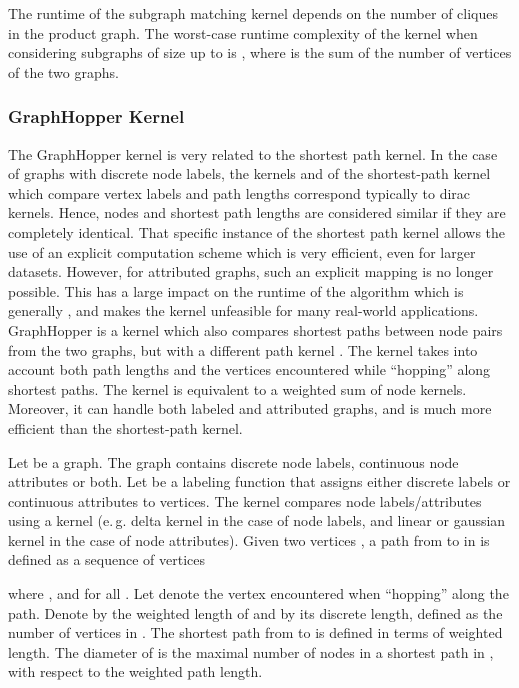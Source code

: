 \documentclass[twoside,11pt]{article}
\newcommand{\eg}{e.\,g. }
\begin{document}
The runtime of the subgraph matching kernel depends on the number of cliques in the product graph.
The worst-case runtime complexity of the kernel when considering subgraphs of size up to  is , where  is the sum of the number of vertices of the two graphs.


\subsubsection{GraphHopper Kernel}
The GraphHopper kernel is very related to the shortest path kernel.
In the case of graphs with discrete node labels, the kernels  and  of the shortest-path kernel which compare vertex labels and path lengths correspond typically to dirac kernels.
Hence, nodes and shortest path lengths are considered similar if they are completely identical.
That specific instance of the shortest path kernel allows the use of an explicit computation scheme which is very efficient, even for larger datasets.
However, for attributed graphs, such an explicit mapping is no longer possible.
This has a large impact on the runtime of the algorithm which is generally , and makes the kernel unfeasible for many real-world applications.
GraphHopper is a kernel which also compares shortest paths between node pairs from the two graphs, but with a different path kernel
\cite{feragen2013scalable}.
The kernel takes into account both path lengths and the vertices encountered while ``hopping'' along shortest paths.
The kernel is equivalent to a weighted sum of node kernels.
Moreover, it can handle both labeled and attributed graphs, and is much more efficient than the shortest-path kernel.

Let  be a graph.
The graph contains discrete node labels, continuous node attributes or both.
Let  be a labeling function that assigns either discrete labels or continuous attributes to vertices.
The kernel compares node labels/attributes using a kernel  (\eg delta kernel in the case of node labels, and linear or gaussian kernel in the case of node attributes).
Given two vertices , a path  from  to  in  is defined as a sequence of vertices

where ,  and  for all .
Let  denote the  vertex encountered when ``hopping'' along the path.
Denote by  the weighted length of  and by  its discrete length, defined as the number of vertices in .
The shortest path  from  to  is defined in terms of weighted length.
The diameter  of  is the maximal number of nodes in a shortest path in , with respect to the weighted path length.
\end{document}
